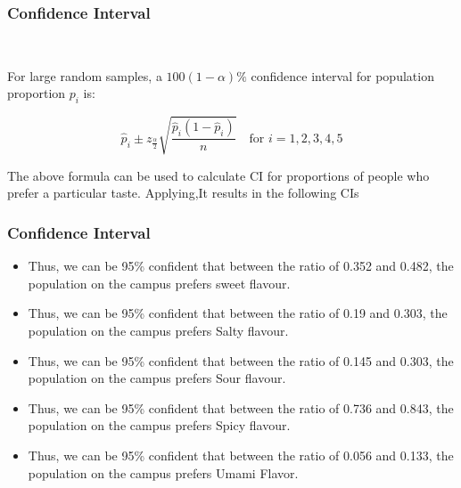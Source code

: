 \documentclass{beamer}
\begin{document}
\begin{frame}
    \frametitle{Confidence Interval}\
    \begin{block}{}
    
    For large random samples, a $100(1 - \alpha)\%$ confidence interval for population proportion $p_i$ is:
    
    \[
    \hat{p}_i \pm z_{\frac{\alpha}{2}} \sqrt{\frac{\hat{p}_i(1 - \hat{p}_i)}{n}}
    \quad \text{for } i = 1, 2, 3, 4, 5
    \]
    \end{block}
    The above formula can be used to calculate CI for proportions of people who prefer a particular taste. Applying,It results in the following CIs \\
    
     
    
\end{frame}


\begin{frame}
    \frametitle{Confidence Interval}
    
    \begin{itemize}
        \item Thus, we can be 95\% confident that between the ratio of 0.352 and 0.482, the population on the campus prefers sweet flavour.
        
        \item Thus, we can be 95\% confident that between the ratio of 0.19 and 0.303, the population on the campus prefers Salty flavour.
        
        \item Thus, we can be 95\% confident that between the ratio of 0.145 and 0.303, the population on the campus prefers Sour flavour.
        
        \item Thus, we can be 95\% confident that between the ratio of 0.736 and 0.843, the population on the campus prefers Spicy flavour.
        
        \item Thus, we can be 95\% confident that between the ratio of 0.056 and 0.133, the population on the campus prefers Umami Flavor.
    \end{itemize}
\end{frame}



\end{document}
